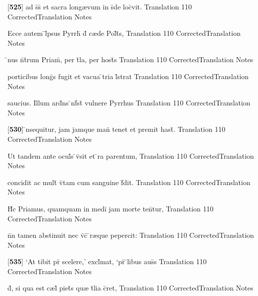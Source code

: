 \latline
  {[\textbf{525}] ad s\={}s\={} et sacra long{\ae}vum in s\={}de loc\={}vit.}
  { Translation }
  {110}
  { CorrectedTranslation }
  { Notes }


\latline
  {Ecce autem \={}l\={}psus Pyrrh\={\macron {\i}} d\={} c{\ae}de Pol\={\macron {\i}}t\={}s,}
  { Translation }
  {110}
  { CorrectedTranslation }
  { Notes }


\latline
  {\={}nus n\={}t\={}rum Priam\={\macron {\i}}, per t\={}la, per host\={\macron {\i}}s}
  { Translation }
  {110}
  { CorrectedTranslation }
  { Notes }


\latline
  {porticibus long\={\macron {\i}}s fugit et vacua \={}tria l\={}strat}
  { Translation }
  {110}
  { CorrectedTranslation }
  { Notes }


\latline
  {saucius.  Illum ard\={}ns \={\macron {\i}}nf\={}st\={} vulnere Pyrrhus}
  { Translation }
  {110}
  { CorrectedTranslation }
  { Notes }


\latline
  {[\textbf{530}] \={\macron {\i}}nsequitur, jam jamque man\={} tenet et premit hast\={}.}
  { Translation }
  {110}
  { CorrectedTranslation }
  { Notes }


\latline
  {Ut tandem ante ocul\={}s \={}v\={}sit et \={}ra parentum,}
  { Translation }
  {110}
  { CorrectedTranslation }
  { Notes }


\latline
  {concidit ac mult\={} v\={\macron {\i}}tam cum sanguine f\={}dit.}
  { Translation }
  {110}
  { CorrectedTranslation }
  { Notes }


\latline
  {H\={\macron {\i}}c Priamus, quamquam in medi\={} jam morte ten\={}tur,}
  { Translation }
  {110}
  { CorrectedTranslation }
  { Notes }


\latline
  {n\={}n tamen abstinuit nec v\={}c\={\macron {\i}} \={\macron {\i}}r{\ae}que pepercit:}
  { Translation }
  {110}
  { CorrectedTranslation }
  { Notes }


\latline
  {[\textbf{535}] `At tibit pr\={} scelere,' excl\={}mat, `pr\={} \={}libus aus\={\macron {\i}}s}
  { Translation }
  {110}
  { CorrectedTranslation }
  { Notes }


\latline
  {d\={\macron {\i}}, si qua est c{\ae}l\={} piet\={}s qu{\ae} t\={}lia c\={}ret,}
  { Translation }
  {110}
  { CorrectedTranslation }
  { Notes }



